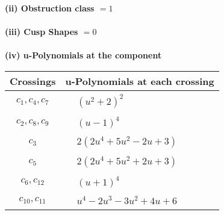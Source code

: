 \documentclass[1p]{elsarticle_modified}
\theoremstyle{definition}
\begin{document}
\flushleft \textbf{(ii) Obstruction class $= 1$}\\~\\
\flushleft \textbf{(iii) Cusp Shapes $= 0$}\\~\\
\newpage\renewcommand{\arraystretch}{1}
\flushleft \textbf{(iv) u-Polynomials at the component}\newline \\
\begin{tabular}{m{50pt}|m{274pt}}
Crossings & \hspace{64pt}u-Polynomials at each crossing \\
\hline $$\begin{aligned}c_{1},c_{4},c_{7}\end{aligned}$$&$\begin{aligned}
&(u^2+2)^2
\end{aligned}$\\
\hline $$\begin{aligned}c_{2},c_{8},c_{9}\end{aligned}$$&$\begin{aligned}
&(u-1)^4
\end{aligned}$\\
\hline $$\begin{aligned}c_{3}\end{aligned}$$&$\begin{aligned}
&2(2 u^4+5 u^2-2 u+3)
\end{aligned}$\\
\hline $$\begin{aligned}c_{5}\end{aligned}$$&$\begin{aligned}
&2(2 u^4+5 u^2+2 u+3)
\end{aligned}$\\
\hline $$\begin{aligned}c_{6},c_{12}\end{aligned}$$&$\begin{aligned}
&(u+1)^4
\end{aligned}$\\
\hline $$\begin{aligned}c_{10},c_{11}\end{aligned}$$&$\begin{aligned}
&u^4-2 u^3-3 u^2+4 u+6
\end{aligned}$\\
\hline
\end{tabular}\\~\\
\end{document}
